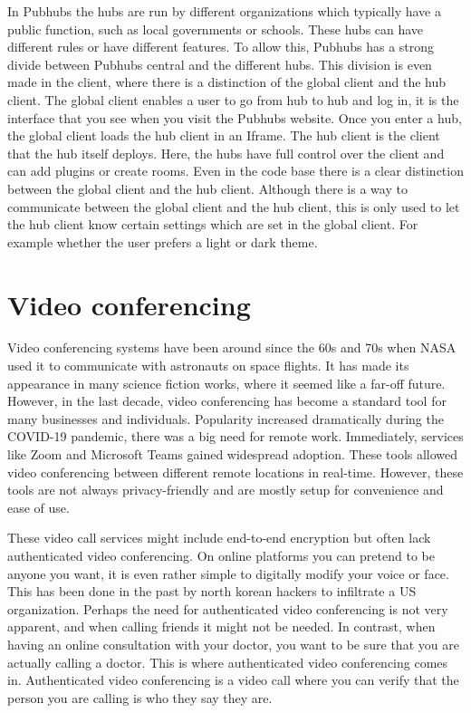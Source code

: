 \documentclass{report}
\begin{document}
In Pubhubs the hubs are run by different organizations which typically have a public function, such as
local governments or schools.
These hubs can have different rules or have different features.
To allow this, Pubhubs has a strong divide between Pubhubs central and the different hubs.
This division is even made in the client, where there is a distinction of the global client and the hub client.
The global client enables a user to go from hub to hub and log in, it is
the interface that you see when you visit the Pubhubs website.
Once you enter a hub, the global client loads the hub client in an Iframe. The hub client
is the client that the hub itself deploys. Here, the hubs have full control
over the client and can add plugins or create rooms.
Even in the code base there is a clear distinction between the global client and the hub client.
Although there is a way to communicate between the global client and the hub client, this
is only used to let the hub client know certain settings which are set in the global client.
For example whether the user prefers a light or dark theme.


\section{Video conferencing}
Video conferencing systems have been around since the 60s and 70s when NASA used it to communicate with astronauts
on space flights. It has made its appearance in many science fiction works, where it seemed like a far-off future.
However, in the last decade, video conferencing has become a standard tool for many businesses and individuals.
Popularity increased dramatically during the COVID-19 pandemic, there was a big need for remote work. Immediately,
services like Zoom \cite{Zoom} and Microsoft Teams  \cite{MSTeams} gained widespread adoption. These tools allowed
video conferencing between different remote locations in real-time. However, these tools are not always
privacy-friendly and are mostly setup for convenience and ease of use.

These video call services might include end-to-end encryption but often lack authenticated video conferencing. On
online platforms you can pretend to be anyone you want, it is even rather simple to digitally modify your voice or
face. This has been done in the past by north korean hackers to infiltrate a US organization. Perhaps the need for
authenticated video conferencing is not very apparent, and when calling friends it might not be needed. In contrast, when having an online consultation with your doctor, you
want to be sure that you are actually calling a doctor. This is where authenticated video conferencing comes in.
Authenticated video conferencing is a video call where you can verify that the person you are calling is who they say they are.
\end{document}
